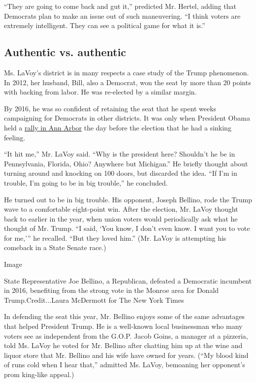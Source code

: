 ``They are going to come back and gut it,'' predicted Mr. Hertel, adding
that Democrats plan to make an issue out of such maneuvering. ``I think
voters are extremely intelligent. They can see a political game for what
it is.''

\hypertarget{authentic-vs-authentic}{%
\subsection{Authentic vs. authentic}\label{authentic-vs-authentic}}

Ms. LaVoy's district is in many respects a case study of the Trump
phenomenon. In 2012, her husband, Bill, also a Democrat, won the seat by
more than 20 points with backing from labor. He was re-elected by a
similar margin.

By 2016, he was so confident of retaining the seat that he spent weeks
campaigning for Democrats in other districts. It was only when President
Obama held a
\href{https://www.detroitnews.com/story/news/politics/2016/11/07/harbaugh-obama/93426394/}{rally
in Ann Arbor} the day before the election that he had a sinking feeling.

``It hit me,'' Mr. LaVoy said. ``Why is the president here? Shouldn't he
be in Pennsylvania, Florida, Ohio? Anywhere but Michigan.'' He briefly
thought about turning around and knocking on 100 doors, but discarded
the idea. ``If I'm in trouble, I'm going to be in big trouble,'' he
concluded.

He turned out to be in big trouble. His opponent, Joseph Bellino, rode
the Trump wave to a comfortable eight-point win. After the election, Mr.
LaVoy thought back to earlier in the year, when union voters would
periodically ask what he thought of Mr. Trump. ``I said, `You know, I
don't even know. I want you to vote for me,''' he recalled. ``But they
loved him.'' (Mr. LaVoy is attempting his comeback in a State Senate
race.)

Image

State Representative Joe Bellino, a Republican, defeated a Democratic
incumbent in 2016, benefiting from the strong vote in the Monroe area
for Donald Trump.Credit...Laura McDermott for The New York Times

In defending the seat this year, Mr. Bellino enjoys some of the same
advantages that helped President Trump. He is a well-known local
businessman who many voters see as independent from the G.O.P. Jacob
Goins, a manager at a pizzeria, told Ms. LaVoy he voted for Mr. Bellino
after chatting him up at the wine and liquor store that Mr. Bellino and
his wife have owned for years. (``My blood kind of runs cold when I hear
that,'' admitted Ms. LaVoy, bemoaning her opponent's prom king-like
appeal.)

